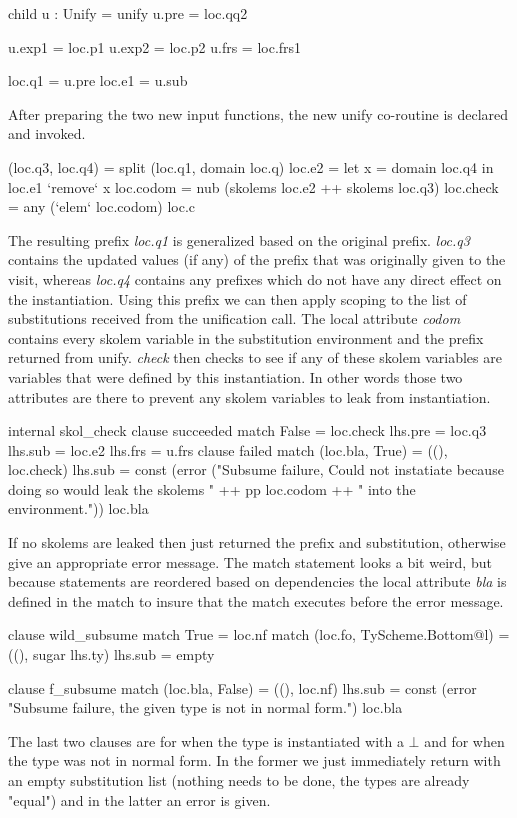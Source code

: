 \begin{code}
child u : Unify = unify
u.pre  = loc.qq2

u.exp1 = loc.p1
u.exp2 = loc.p2
u.frs  = loc.frs1

loc.q1 = u.pre
loc.e1 = u.sub
\end{code}
After preparing the two new input functions, the new unify co-routine is declared and invoked.

\begin{code}   
(loc.q3, loc.q4) = split (loc.q1, domain loc.q)
loc.e2 = let x = domain loc.q4
         in loc.e1 `remove` x
loc.codom = nub (skolems loc.e2 ++ skolems loc.q3)
loc.check = any (`elem` loc.codom) loc.c
\end{code}
The resulting prefix \emph{loc.q1} is generalized based on the original prefix. \emph{loc.q3} contains the updated values (if any) of the prefix that was  originally given to the visit, whereas \emph{loc.q4} contains any prefixes which do not have any direct effect on the instantiation. Using this prefix we can then apply scoping to the list of substitutions received from the unification call.
The local attribute \emph{codom} contains every skolem variable in the substitution environment and the prefix returned from unify. \emph{check} then checks to see if any of these skolem variables are variables that were defined by this instantiation. In other words those two attributes are there to prevent any skolem variables to leak from instantiation.

\begin{code}
internal skol_check
  clause succeeded
    match False  = loc.check
    lhs.pre = loc.q3
    lhs.sub = loc.e2
    lhs.frs = u.frs
  clause failed
    match (loc.bla, True) = ((), loc.check)
    lhs.sub = const (error ("Subsume failure, Could not instatiate because doing so would leak the skolems " ++ pp loc.codom ++ " into the environment.")) loc.bla
\end{code}
If no skolems are leaked then just returned the prefix and substitution, otherwise give an appropriate error message. The match statement looks a bit weird, but because statements are reordered based on dependencies the local attribute \emph{bla} is defined in the match to insure that the match executes before the error message.

\begin{code}
clause wild_subsume
  match True                        = loc.nf
  match (loc.fo, TyScheme.Bottom@l) = ((), sugar lhs.ty)
  lhs.sub = empty
  
clause f_subsume
  match (loc.bla, False) = ((), loc.nf)
  lhs.sub = const (error "Subsume failure, the given type is not in normal form.") loc.bla
\end{code}
The last two clauses are for when the type is instantiated with a $\bot$ and for when the type was not in normal form. In the former we just immediately return with an empty substitution list (nothing needs to be done, the types are already "equal") and in the latter an error is given.

